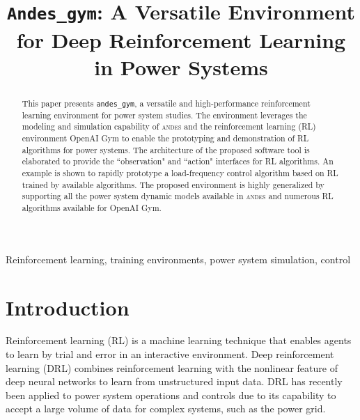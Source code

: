 \documentclass[conference]{IEEEtran}
\newcommand{\andesgym}{\texttt{andes\_gym}\xspace}
\newcommand{\andes}{\textsc{andes}\xspace}
\begin{document}
\title{\texttt{Andes\_gym}: A Versatile Environment for Deep Reinforcement Learning in Power Systems
}

\author{
\and
{}
}

\maketitle

\begin{abstract}
This paper presents \andesgym, a versatile and high-performance reinforcement learning environment for power system studies.
The environment leverages the modeling and simulation capability of \andes and the reinforcement learning (RL) environment OpenAI Gym to enable the prototyping and demonstration of RL algorithms for power systems.
The architecture of the proposed software tool is elaborated to provide the ``observation" and ``action" 
interfaces for RL algorithms.
An example is shown to rapidly prototype a load-frequency control algorithm based on RL trained by available algorithms.
The proposed environment is highly generalized by supporting all the power system dynamic models available in \andes and numerous RL algorithms available for OpenAI Gym.
\end{abstract}

\begin{IEEEkeywords}
Reinforcement learning, training environments, power system simulation, control
\end{IEEEkeywords}

\section{Introduction}
Reinforcement learning (RL) is a machine learning technique that enables agents to learn by trial and error in an interactive environment.
Deep reinforcement learning (DRL) combines reinforcement learning with the nonlinear feature of deep neural networks to learn from unstructured input data.
DRL has recently been applied to power system operations and controls due to its capability to accept a large volume of data for complex systems, such as the power grid.
\end{document}
